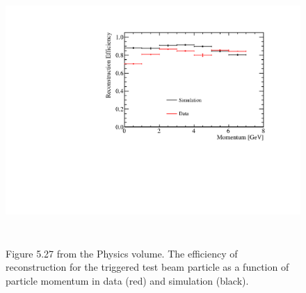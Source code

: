 \begin{figure}[htp]
\centering
\includegraphics[height=4in]{graphics/BeamParticleEfficiencyVsMomentum.pdf}
\caption{Figure 5.27 from the Physics volume. The efficiency of reconstruction for the triggered test beam particle as a function of particle
momentum in data (red) and simulation (black).}
\label{fig:ch-exec-comp-tracking}
\end{figure}





